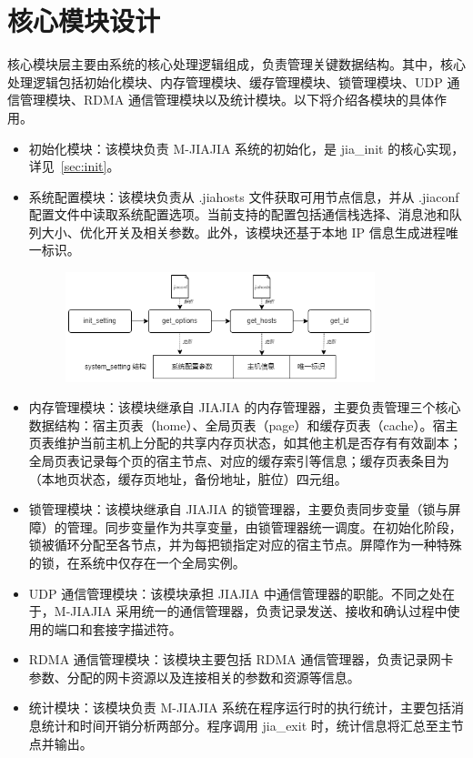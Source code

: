 {    \section{核心模块设计}
    核心模块层主要由系统的核心处理逻辑组成，负责管理关键数据结构。其中，核心处理逻辑包括初始化模块、内存管理模块、缓存管理模块、锁管理模块、UDP 通信管理模块、RDMA 通信管理模块以及统计模块。以下将介绍各模块的具体作用。
    \begin{itemize}
        \item 初始化模块：该模块负责 M-JIAJIA 系统的初始化，是 jia\_init 的核心实现，详见~\ref{sec:init}。
        \item 系统配置模块：该模块负责从 .jiahosts 文件获取可用节点信息，并从 .jiaconf 配置文件中读取系统配置选项。当前支持的配置包括通信栈选择、消息池和队列大小、优化开关及相关参数。此外，该模块还基于本地 IP 信息生成进程唯一标识。
              \begin{figure}[!htbp]
                  \centering
                  \includegraphics[width=0.85\textwidth]{Img/system_setting.png}
                  \label{fig:system-setting-module}
              \end{figure}

        \item 内存管理模块：该模块继承自 JIAJIA 的内存管理器，主要负责管理三个核心数据结构：宿主页表（home）、全局页表（page）和缓存页表（cache）。宿主页表维护当前主机上分配的共享内存页状态，如其他主机是否存有有效副本；全局页表记录每个页的宿主节点、对应的缓存索引等信息；缓存页表条目为（本地页状态，缓存页地址，备份地址，脏位）四元组。
        \item 锁管理模块：该模块继承自 JIAJIA 的锁管理器，主要负责同步变量（锁与屏障）的管理。同步变量作为共享变量，由锁管理器统一调度。在初始化阶段，锁被循环分配至各节点，并为每把锁指定对应的宿主节点。屏障作为一种特殊的锁，在系统中仅存在一个全局实例。
        \item UDP 通信管理模块：该模块承担 JIAJIA 中通信管理器的职能。不同之处在于，M-JIAJIA 采用统一的通信管理器，负责记录发送、接收和确认过程中使用的端口和套接字描述符。
        \item RDMA 通信管理模块：该模块主要包括 RDMA 通信管理器，负责记录网卡参数、分配的网卡资源以及连接相关的参数和资源等信息。
        \item 统计模块：该模块负责 M-JIAJIA 系统在程序运行时的执行统计，主要包括消息统计和时间开销分析两部分。程序调用 jia\_exit 时，统计信息将汇总至主节点并输出。
    \end{itemize}
}
